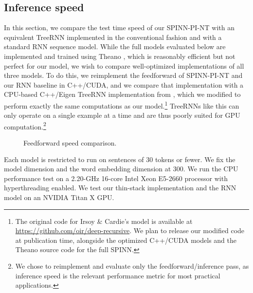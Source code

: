 \documentclass[11pt]{article}
\begin{document}
\subsection{Inference speed}
\label{sec:speed}

In this section, we compare the test time speed of our SPINN-PI-NT with an equivalent TreeRNN implemented in the conventional fashion and with a standard RNN sequence model. While the full models evaluated below are implemented and trained using Theano \citep{bergstra+al:2010-scipy,Bastien-Theano-2012}, which is reasonably efficient but not perfect for our model, we wish to compare well-optimized implementations of all three models. To do this, we reimplement the feedforward of SPINN-PI-NT and our RNN baseline in C++/CUDA, and we compare that implementation with a CPU-based C++/Eigen TreeRNN implementation from \citet{irsoy2014deep}, which we modified to perform exactly the same computations as our model.\footnote{The original code for Irsoy \& Cardie's model is available at \url{https://github.com/oir/deep-recursive}. We plan to release our modified code at publication time, alongside the optimized C++/CUDA models and the Theano source code for the full SPINN.} TreeRNNs like this can only operate on a single example at a time and are thus poorly suited for GPU computation.\footnote{We chose to reimplement and evaluate only the feedforward/inference pass, as inference speed is the relevant performance metric for most practical applications.}


\begin{figure}
\centering
{}
\caption{Feedforward speed comparison.}
\label{fig:speed}
\end{figure}


Each model is restricted to run on sentences of 30 tokens or fewer. We fix the model dimension and the word embedding dimension at 300. We run the CPU performance test on a 2.20-GHz 16-core Intel Xeon E5-2660 processor with hyperthreading enabled. We test our thin-stack implementation and the RNN model on an NVIDIA Titan X GPU.
\end{document}
